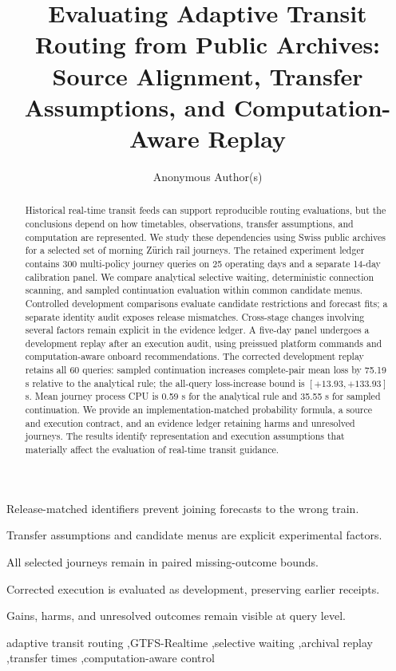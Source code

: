 \documentclass[preprint,12pt,authoryear]{elsarticle}
\begin{document}
\begin{frontmatter}
\title{Evaluating Adaptive Transit Routing from Public Archives: Source Alignment, Transfer Assumptions, and Computation-Aware Replay}
\author[anon]{Anonymous Author(s)}
\begin{abstract}
Historical real-time transit feeds can support reproducible routing evaluations,
but the conclusions depend on how timetables, observations, transfer assumptions,
and computation are represented. We study these dependencies using Swiss public
archives for a selected set of morning Z\"urich rail journeys. The retained
experiment ledger contains 300 multi-policy journey queries on 25 operating
days and a separate 14-day calibration panel. We compare analytical selective
waiting, deterministic connection scanning, and sampled continuation evaluation
within common candidate menus. Controlled development comparisons evaluate
candidate restrictions and forecast fits; a separate identity audit exposes
release mismatches. Cross-stage changes involving several factors remain
explicit in the evidence ledger.
A five-day panel undergoes a development replay after an execution audit, using
preissued platform commands and computation-aware onboard recommendations.
The corrected development replay retains all 60 queries: sampled continuation increases complete-pair mean loss by 75.19 s relative to the analytical rule; the all-query loss-increase bound is $[+13.93,+133.93]$ s. Mean journey process CPU is 0.59 s for the analytical rule and 35.55 s for sampled continuation.
We provide an implementation-matched probability formula, a source and execution
contract, and an evidence ledger retaining harms and unresolved journeys.
The results identify representation and execution assumptions that materially
affect the evaluation of real-time transit guidance.
\end{abstract}
\begin{highlights}
\item Release-matched identifiers prevent joining forecasts to the wrong train.
\item Transfer assumptions and candidate menus are explicit experimental factors.
\item All selected journeys remain in paired missing-outcome bounds.
\item Corrected execution is evaluated as development, preserving earlier receipts.
\item Gains, harms, and unresolved outcomes remain visible at query level.
\end{highlights}
\begin{keyword}
adaptive transit routing \sep GTFS-Realtime \sep selective waiting \sep archival replay \sep transfer times \sep computation-aware control
\end{keyword}
\end{frontmatter}
\end{document}
